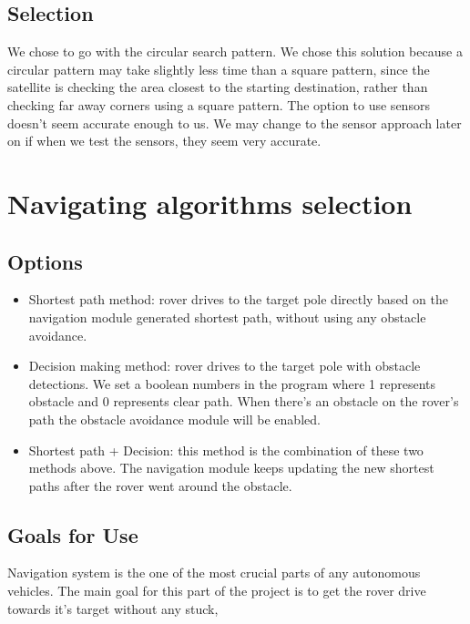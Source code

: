 \documentclass[10pt,letterpaper,onecolumn,journal]{IEEEtran}
\begin{document}
\subsection{Selection}
We chose to go with the circular search pattern. We chose this solution because a circular pattern may take slightly less time than a square pattern, since the satellite is checking the area closest to the starting destination, rather than checking far away corners using a square pattern. The option to use sensors doesn’t seem accurate enough to us. We may change to the sensor approach later on if when we test the sensors, they seem very accurate.

\section{Navigating algorithms selection}

\subsection{Options}
\begin{itemize}
	\item Shortest path method: rover drives to the target pole directly based on the navigation module generated shortest path, without using any obstacle avoidance.
	
	\item Decision making method: rover drives to the target pole with obstacle detections. We set a boolean numbers in the program where 1 represents obstacle and 0 represents clear path. When there's an obstacle on the rover's path the obstacle avoidance module will be enabled. \cite{Autonomous Autonavigation Robot}
	
	\item Shortest path + Decision: this method is the combination of these two methods above. The navigation module keeps updating the new shortest paths after the rover went around the obstacle.\cite{Autonomous Vehicle Navigation and Mapping System}
\end{itemize}
\subsection{Goals for Use}
Navigation system is the one of the most crucial parts of any autonomous vehicles. The main goal for this part of the project is to get the rover drive towards it's target without any stuck,   
\end{document}

